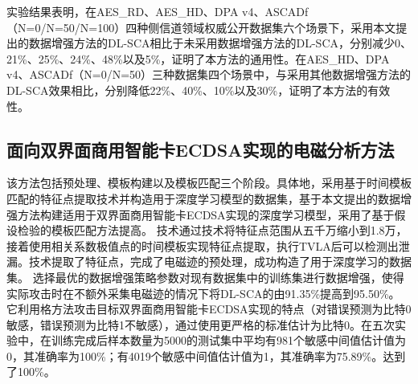 {	实验结果表明，在AES\_RD、AES\_HD、DPA v4、ASCADf（N=0/N=50/N=100）四种侧信道领域权威公开数据集六个场景下，采用本文提出的数据增强方法的DL-SCA相比于未采用数据增强方法的DL-SCA，\chenggongtiaoshu 分别减少0、21\%、25\%、24\%、48\%以及5\%，证明了本方法的通用性。在AES\_HD、DPA v4、ASCADf（N=0/N=50）三种数据集四个场景中，与采用其他数据增强方法的DL-SCA效果相比，\chenggongtiaoshu 分别降低22\%、40\%、10\%以及30\%，证明了本方法的有效性。
	\subsection{面向双界面商用智能卡ECDSA实现的电磁分析方法}
	
	
	
	该方法包括预处理、模板构建以及模板匹配三个阶段。具体地，采用基于时间模板匹配的特征点提取技术并构造用于深度学习模型的数据集，基于本文提出的数据增强方法构建适用于双界面商用智能卡ECDSA实现的深度学习模型，采用了基于假设检验的模板匹配方法提高\zyx。
	\yuchuli 技术通过\poifanwei 技术将特征点范围从五千万缩小到1.8万，接着使用相关系数极值点的时间模板实现特征点提取，执行TVLA后可以检测出泄漏。\yuchuli 技术提取了特征点，完成了电磁迹的预处理，成功构造了用于深度学习的数据集。
	\shujuzengqiang 选择最优的数据增强策略参数对现有数据集中的训练集进行数据增强，使得实际攻击时在不额外采集电磁迹的情况下将DL-SCA的\zyx 由91.35\%提高到95.50\%。
	\jiashejianyanguji 它利用格方法攻击目标双界面商用智能卡ECDSA实现的特点（对错误预测为比特0敏感，错误预测为比特1不敏感），通过使用更严格的标准估计为比特0。在五次实验中，在训练完成后样本数量为5000的测试集中平均有981个敏感中间值估计值为0，其准确率为100\%；有4019个敏感中间值估计值为1，其准确率为75.89\%。\zyx 达到了100\%。
	
}
